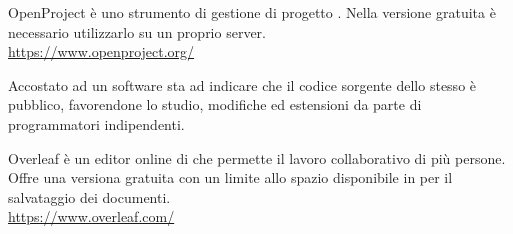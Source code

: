 OpenProject è uno strumento di gestione di progetto . Nella versione gratuita è necessario utilizzarlo su un proprio server.\\
\url{https://www.openproject.org/}

Accostato ad un software sta ad indicare che il codice sorgente dello stesso \`e pubblico, favorendone lo studio, modifiche ed estensioni da parte di programmatori indipendenti.

Overleaf è un editor online di  che permette il lavoro collaborativo di più persone. Offre una versiona gratuita con un limite allo spazio disponibile in  per il salvataggio dei documenti.\\
\url{https://www.overleaf.com/}
\clearpage